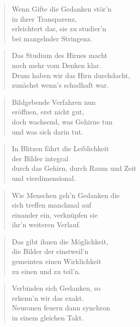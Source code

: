 \documentclass[10pt,a4paper]{article}
\begin{document}
\begin{multicols}{2}
\begin{verse}
Wenn Gifte die Gedanken stör’n \\
in ihrer Transparenz, \\
erleichtert das, sie zu studier’n \\
bei mangelnder Stringenz. \\
\end{verse}

\begin{verse}
Das Studium des Hirnes macht \\
noch mehr vom Denken klar. \\
Drum haben wir das Hirn durchdacht, \\
zunächst wenn’s schadhaft war. \\
\end{verse}

\begin{verse}
Bildgebende Verfahren nun \\
eröffnen, erst nicht gut, \\
doch wachsend, was Gehirne tun \\
und was sich darin tut. \\
\end{verse}

\begin{verse}
In Blitzen fährt die Leiblichkeit \\
der Bilder integral \\
durch das Gehirn, durch Raum und Zeit \\
und vierdimensional. \\
\end{verse}

\begin{verse}
Wie Menschen geh’n Gedanken die \\
sich treffen manchmal auf \\
einander ein, verknüpfen sie \\
ihr’n weiteren Verlauf. \\
\end{verse}

\begin{verse}
Das gibt ihnen die Möglichkeit, \\
die Bilder der einstweil’n \\
gemeinten einen Wirklichkeit \\
zu einen und zu teil’n. \\
\end{verse}

\begin{verse}
Verbinden sich Gedanken, so \\
erkenn’n wir das exakt. \\
Neuronen feuern dann synchron \\
in einem gleichen Takt. \\
\end{verse}


\end{multicols}
\end{document}
